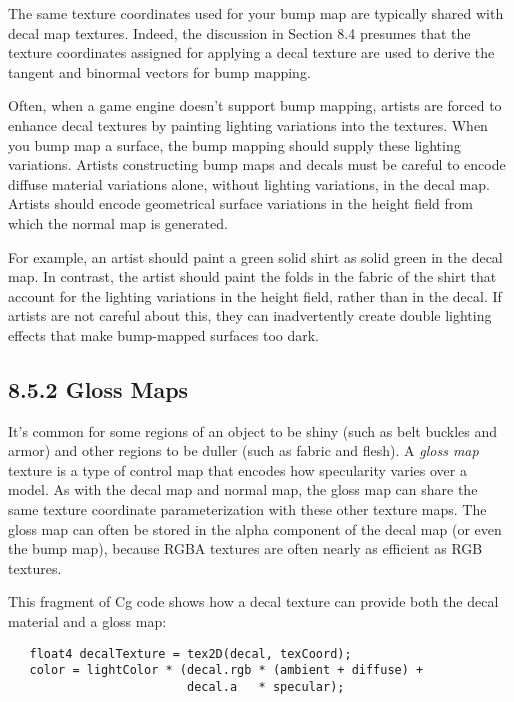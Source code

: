\documentclass[../main.tex]{subfiles}
\begin{document}
The same texture coordinates used for your bump map are typically shared with decal map textures. Indeed, the discussion in Section 8.4 presumes that the texture coordinates assigned for applying a decal texture are used to derive the tangent and binormal vectors for bump mapping.

Often, when a game engine doesn't support bump mapping, artists are forced to enhance decal textures by painting lighting variations into the textures. When you bump map a surface, the bump mapping should supply these lighting variations. Artists constructing bump maps and decals must be careful to encode diffuse material variations alone, without lighting variations, in the decal map. Artists should encode geometrical surface variations in the height field from which the normal map is generated.

For example, an artist should paint a green solid shirt as solid green in the decal map. In contrast, the artist should paint the folds in the fabric of the shirt that account for the lighting variations in the height field, rather than in the decal. If artists are not careful about this, they can inadvertently create double lighting effects that make bump-mapped surfaces too dark.

\subsection{8.5.2 Gloss Maps}

It's common for some regions of an object to be shiny (such as belt buckles and armor) and other regions to be duller (such as fabric and flesh). A \textit{gloss map} texture is a type of control map that encodes how specularity varies over a model. As with the decal map and normal map, the gloss map can share the same texture coordinate parameterization with these other texture maps. The gloss map can often be stored in the alpha component of the decal map (or even the bump map), because RGBA textures are often nearly as efficient as RGB textures.

This fragment of Cg code shows how a decal texture can provide both the decal material and a gloss map:

\FloatBarrier
\begin{lstlisting}
   float4 decalTexture = tex2D(decal, texCoord);
   color = lightColor * (decal.rgb * (ambient + diffuse) +
                         decal.a   * specular);
\end{lstlisting}
\FloatBarrier
\end{document}
